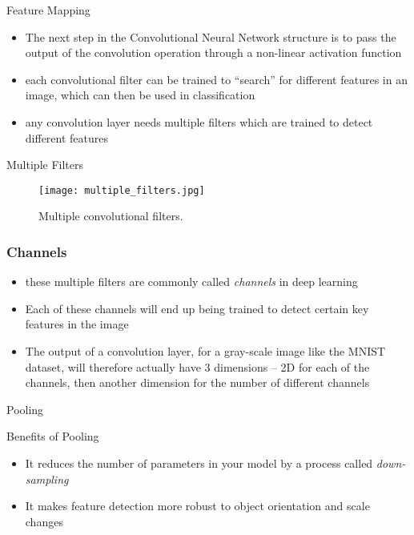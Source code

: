 \documentclass[14 pt]{beamer}
\let\olditem\item
\renewcommand{\item}{\olditem\vspace{4pt}}
\begin{document}
 \begin{frame}{Feature Mapping}
   \begin{itemize}
   \item The next step in the Convolutional Neural Network structure is to
     pass the output of the convolution operation through a non-linear
     activation function
   \item each convolutional filter can be trained to ``search'' for
     different features in an image, which can then be used in
     classification
   \item any convolution layer needs multiple filters which are trained to
     detect different features
   \end{itemize}
 \end{frame}

\begin{frame}{Multiple Filters}
  \begin{figure}
     \texttt{[image: multiple\_filters.jpg]}
     \caption{Multiple convolutional filters.}
   \end{figure}
 \end{frame}

 \begin{frame}
   \frametitle{Channels}
   \begin{itemize}
   \item these multiple filters are commonly called \emph{channels} in deep
     learning
   \item Each of these channels will end up being trained to detect certain
     key features in the image
   \item The output of a convolution layer, for a gray-scale image like the
     MNIST dataset, will therefore actually have 3 dimensions – 2D for each
     of the channels, then another dimension for the number of different
     channels
   \end{itemize}
 \end{frame}

 \begin{frame}
   \begin{center}
     \Large{Pooling}
   \end{center}
 \end{frame}

 \begin{frame}{Benefits of Pooling}
   \begin{itemize}
   \item It reduces the number of parameters in your model by a process
     called \emph{down-sampling}
   \item It makes feature detection more robust to object orientation and
     scale changes
   \end{itemize}
 \end{frame}
\end{document}
